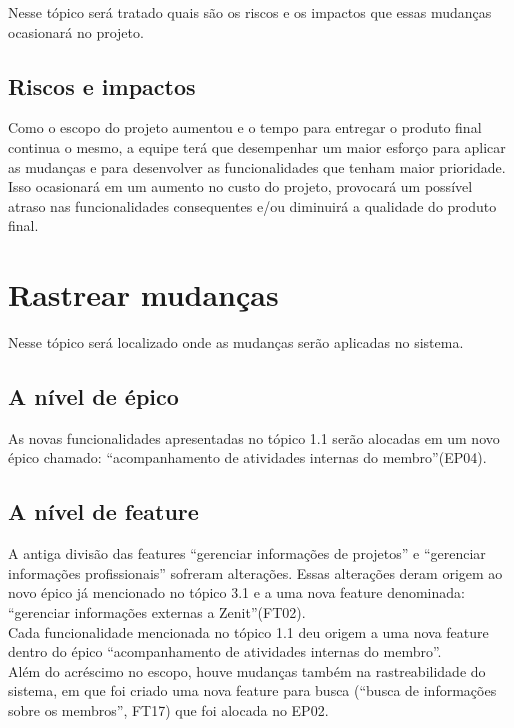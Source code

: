 \begin{anexosenv}
Nesse tópico será tratado quais são os riscos e os impactos que essas mudanças ocasionará no projeto.\\

\subsection[Riscos e impactos]{Riscos e impactos}

Como o escopo do projeto aumentou e o tempo para entregar o produto final continua o mesmo, a equipe terá que desempenhar um maior esforço para aplicar as mudanças e para desenvolver as funcionalidades que tenham maior prioridade. Isso ocasionará em um aumento no custo do projeto,  provocará um possível atraso nas funcionalidades consequentes e/ou diminuirá a qualidade do produto final.\\

\section[Rastrear mudanças]{Rastrear mudanças}

Nesse tópico será localizado onde as mudanças serão aplicadas no sistema.\\

\subsection[A nível de épico]{A nível de épico}
    
As novas funcionalidades apresentadas no tópico 1.1 serão alocadas em um novo épico chamado: “acompanhamento de atividades internas do membro”(EP04).\\
    
\subsection[A nível de feature]{A nível de feature}

A antiga divisão das features “gerenciar informações de projetos” e “gerenciar informações profissionais” sofreram alterações. Essas alterações deram origem ao novo épico já mencionado no tópico 3.1 e a uma nova feature denominada: “gerenciar informações externas a Zenit”(FT02).\\
Cada funcionalidade mencionada no tópico 1.1 deu origem a uma nova feature dentro do épico “acompanhamento de atividades internas do membro”.\\
Além do acréscimo no escopo, houve mudanças também na rastreabilidade do sistema, em que foi criado uma nova feature para busca (“busca de informações sobre os membros”, FT17) que foi alocada no EP02.\\


\end{anexosenv}
